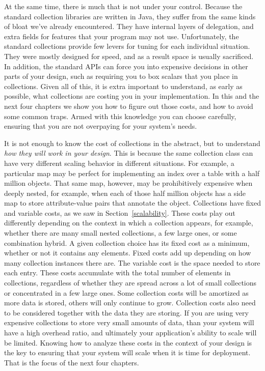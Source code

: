 At the same time, there is much that is not under your control.
Because the standard collection libraries are written in Java, they suffer from
the same kinds of bloat we've already encountered. They have internal layers
of delegation, and extra fields for features that your program may not
use. Unfortunately, the standard collections provide few levers for
tuning for each individual situation. They were
mostly designed for speed, and as a result space is usually sacrificed. In
addition, the standard APIs can force you into expensive decisions in other
parts of your design, such as requiring you to box scalars that you place in
collections. Given all of this, it is extra important to understand, as early as possible,
what collections are costing you in your implementation. In this and
the next four chapters we show you how to figure out those costs, and how
to avoid some common traps. Armed with this
knowledge you can choose carefully, ensuring that you are not
overpaying for your system's needs.

It is not enough to know the cost
of collections in the abstract, but to understand \emph{how they will work in
your design}. This is because the same collection class can have very different
scaling behavior in different situations. For example, a particular map
may be perfect for implementing an index over a table with a half
million objects. That same map, however, may be prohibitively expensive
when deeply nested, for example, when each of those half
million objects has a side map to store attribute-value pairs that annotate the
object.
Collections have fixed and variable costs, as we saw
in Section~\ref{scalability}. These costs play out differently
depending on the context in which a collection appears, for example, whether
there are many small nested collections, a few large ones, or some combination
hybrid.  A given collection choice has its fixed cost as a minimum,
whether or not it contains any elements. Fixed costs add up depending on how many collection instances there are. The variable cost is the space needed to store each entry. 
These costs accumulate with the total number of
elements in collections, regardless of whether they are spread across a lot of
small collections or concentrated in a few
large ones. 
Some collection costs will be amortized as more data is stored, others will only
continue to grow. Collection costs also need to be considered together with the data they are
storing. If you are using very expensive collections to store very small amounts
of data, than your system will have a high overhead ratio, and ultimately your application's ability
to scale will be limited. 
Knowing how to analyze these costs in the context of your design
is the key to ensuring that your system will scale when it is time for
deployment.  That is the focus of the next four chapters.

